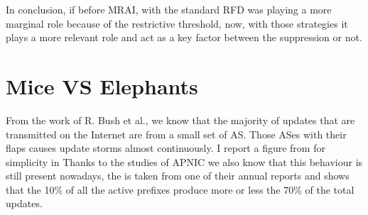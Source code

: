 In conclusion, if before \ac{MRAI}, with the standard \ac{RFD} was playing a more
marginal role because of the restrictive threshold, now, with those strategies
it plays a more relevant role and act as a key factor between the suppression 
or not.


\section{Mice VS Elephants}
\label{sec:bgp_rfd_mice_vs_elephants}

From the work of R. Bush et al., \cite{pelsser2011route} we know that the majority
of updates that are transmitted on the Internet are from a small set of \ac{AS}.
Those \ac{AS}es with their flaps causes update storms almost continuously.
I report a figure from \cite{pelsser2011route} for simplicity in 
Thanks to the studies of APNIC 
we also know that this behaviour is still present nowadays, the 
is taken from one of their annual reports and shows that the \num{10}\% of
all the active prefixes produce more or less the \num{70}\% of the total
updates.

